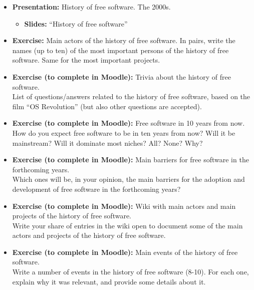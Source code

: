 \documentclass[a4paper]{article}
\begin{document}
\begin{itemize}
\item \textbf{Presentation:} History of free software. The 2000s.
  \begin{itemize}
  \item \textbf{Slides:} ``History of free software''
  \end{itemize}

\item \textbf{Exercise:} Main actors of the history of free software. In pairs, write the names (up to ten) of the most important persons of the history of free software. Same for the most important projects.

\item \textbf{Exercise (to complete in Moodle):} Trivia about the history of free software. \\
  List of questions/answers related to the history of free software, based on the film ``OS Revolution'' (but also other questions are accepted).

\item \textbf{Exercise (to complete in Moodle):} Free software in 10 years from now. \\
  How do you expect free software to be in ten years from now? Will it be mainstream? Will it dominate most niches? All? None? Why?

\item \textbf{Exercise (to complete in Moodle):} Main barriers for free software in the forthcoming years. \\
  Which ones will be, in your opinion, the main barriers for the adoption and development of free software in the forthcoming years?

\item \textbf{Exercise (to complete in Moodle):} Wiki with main actors and main projects of the history of free software. \\
  Write your share of entries in the wiki open to document some of the main actors and projects of the history of free software.

\item \textbf{Exercise (to complete in Moodle):} Main events of the history of free software. \\
  Write a number of events in the history of free software (8-10). For each one, explain why it was relevant, and provide some details about it.


\end{itemize}
\end{document}
